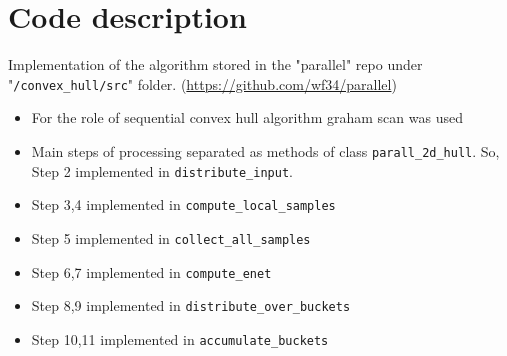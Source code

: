 \documentclass[a4paper]{article}
\begin{document}
\section {Code description}
    Implementation of the algorithm stored in the "parallel" repo under "\verb|/convex_hull/src|" folder. (\url{https://github.com/wf34/parallel})
     \begin {itemize}
         \item For the role of sequential convex hull algorithm graham scan was used
         \item Main steps of processing separated as methods of class \verb|parall_2d_hull|. So, Step 2 implemented in \verb|distribute_input|. 
         \item Step 3,4 implemented in \verb|compute_local_samples|
         \item Step 5 implemented in \verb|collect_all_samples|
         \item Step 6,7 implemented in \verb|compute_enet|
         \item Step 8,9 implemented in \verb|distribute_over_buckets|
         \item Step 10,11  implemented in \verb|accumulate_buckets| 
     \end {itemize}
\end{document}
